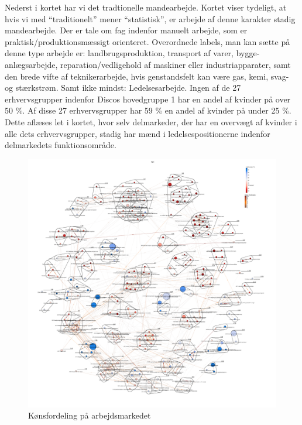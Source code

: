 Nederst i kortet har vi det tradtionelle mandearbejde. Kortet viser tydeligt, at hvis vi med “traditionelt” mener “statistisk”, er arbejde af denne karakter stadig mandearbejde. Der er tale om fag indenfor manuelt arbejde, som er praktisk/produktionsmæssigt orienteret. Overordnede labels, man kan sætte på denne type arbejde er: landbrugsproduktion, transport af varer, bygge-anlægsarbejde, reparation/vedligehold af maskiner eller industriapparater, samt den brede vifte af teknikerarbejde, hvis genstandsfelt kan være gas, kemi, svag- og stærkstrøm. Samt ikke mindst: Ledelsesarbejde. Ingen af de 27 erhvervsgrupper indenfor Discos hovedgruppe 1 har en andel af kvinder på over 50 \%. Af disse 27 erhvervsgrupper har 59 \% en andel af kvinder på under 25 \%. Dette aflæses let i kortet, hvor selv delmarkeder, der har en overvægt af kvinder i alle dets erhvervsgrupper, stadig har mænd i ledelsespositionerne indenfor delmarkedets funktionsområde.  %


%
\begin{figure}[H]
\begin{center}
  \caption{Kønsfordeling på arbejdsmarkedet}
  \label{fig_delanalyse1_kort_koen}
  \includegraphics[width=1.0\textwidth]{fig/netvaerkskort/kort_koen.pdf}
\end{center}
\end{figure}
\restoregeometry
%



